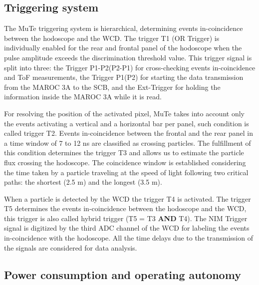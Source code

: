 \documentclass[letterpaper,11pt]{article}
\begin{document}
\subsection{Triggering system}
\label{trigger}
The MuTe triggering system is hierarchical, determining events in-coincidence between the hodoscope and the WCD. The trigger T1 (OR Trigger) is individually enabled for the rear and frontal panel of the hodoscope when the pulse amplitude exceeds the discrimination threshold value. This trigger signal is split into three: the Trigger P1-P2(P2-P1) for cross-checking events in-coincidence and ToF measurements, the Trigger P1(P2) for starting the data transmission from the MAROC 3A to the SCB, and the Ext-Trigger for holding the information inside the MAROC 3A while it is read.

For resolving the position of the activated pixel, MuTe takes into account only the events activating a vertical and a horizontal bar per panel, such condition is called trigger T2. Events in-coincidence between the frontal and the rear panel in a time window of 7 to 12 ns are classified as crossing particles. The fulfillment of this condition determines the trigger T3 and allows us to estimate the particle flux crossing the hodoscope. The coincidence window is established considering the time taken by a particle traveling at the speed of light following two critical paths: the shortest (2.5 m) and the longest (3.5 m).

When a particle is detected by the WCD the trigger T4 is activated. The trigger T5 determines the events in-coincidence between the hodoscope and the WCD, this trigger is also called hybrid trigger (T5 = T3 \textbf{AND} T4). The NIM Trigger signal is digitized by the third ADC channel of the WCD for labeling the events in-coincidence with the hodoscope. All the time delays due to the transmission of the signals are considered for data analysis.

\subsection{Power consumption and operating autonomy}
\end{document}

